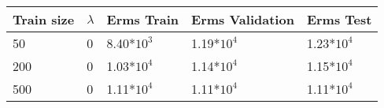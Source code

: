
\begin{center}
\begin{longtable}{l l l l l}
\hline
\hline
\textbf{Train size} & \textbf{$\lambda$} & \textbf{Erms Train} & \textbf{Erms Validation} & \textbf{Erms Test}\\
\hline
\hline
50 & 0 & 8.40*$10^3$ & 1.19*$10^4$ & 1.23*$10^4$  \\
200 & 0 & 1.03*$10^4$ & 1.14*$10^4$ & 1.15*$ 10^4$  \\
500 & 0 & 1.11*$10^4$ & 1.11*$10^4$ & 1.11*$10^4$\\
\hline
\end{longtable}
\setcounter{table}{1}
\end{center}

